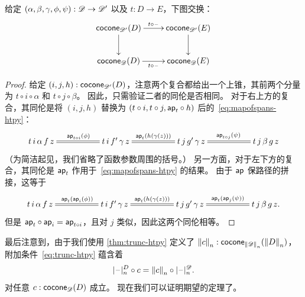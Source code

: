 \begin{lem}\label{thm:conemap-funct}
  给定 $(\alpha,\beta,\gamma,\phi,\psi):\Ddiag \to \Ddiag'$ 以及 $t:D\to E$，下图交换：
  \begin{equation*}
    \vcenter{\xymatrix{
        \cocone{\Ddiag'}{D}\ar[r]^{t \circ {\blank}}\ar[d] &
        \cocone{\Ddiag'}{E}\ar[d]\\
        \cocone{\Ddiag}{D}\ar[r]_{t \circ {\blank}} &
        \cocone{\Ddiag}{E}
      }}
  \end{equation*}
\end{lem}

\begin{proof}
  给定 $(i,j,h):\cocone{\Ddiag'}{D}$，注意两个复合都给出一个上锥，其前两个分量为 $t\circ i\circ \alpha$ 和 $t\circ j\circ\beta$。
  因此，只需验证二者的同伦是否相同。
  对于右上方的复合，其同伦是将 $(i,j,h)$ 替换为 $(t\circ i, t\circ j, \apfunc{t}\circ h)$ 后的~\eqref{eq:mapofspans-htpy}：
  \begin{equation*}
    \xymatrix@+2.8em{
      {t \, i \, \alpha \, f \, z} \ar@{=}[r]^{\apfunc{t\circ i}(\phi)} &
      {t \, i \, f' \, \gamma \, z} \ar@{=}[r]^{\apfunc{t}(h(\gamma(z)))} &
      {t \, j \, g' \, \gamma \, z} \ar@{=}[r]^{\apfunc{t\circ j}(\psi)} &
      {t \, j \, \beta \, g \, z}
    }
  \end{equation*}
  （为简洁起见，我们省略了函数参数周围的括号。）
  另一方面，对于左下方的复合，其同伦是 $\apfunc{t}$ 作用于~\eqref{eq:mapofspans-htpy} 的结果。
  由于 $\apfunc{}$ 保路径的拼接，这等于
  \begin{equation*}
    \xymatrix@+2.8em{
      {t \, i \, \alpha \, f \, z} \ar@{=}[r]^{\apfunc{t}(\apfunc{i}(\phi))} &
      {t \, i \, f' \, \gamma \, z} \ar@{=}[r]^{\apfunc{t}(h(\gamma(z)))} &
      {t \, j \, g' \, \gamma \, z} \ar@{=}[r]^{\apfunc{t}(\apfunc{j}(\psi))} &
      {t \, j \, \beta \, g \, z}. }
  \end{equation*}
  但是 $\apfunc{t}\circ \apfunc{i} = \apfunc{t\circ i}$，且对 $j$ 类似，因此这两个同伦相等。
\end{proof}

最后注意到，由于我们使用 \cref{thm:trunc-htpy} 定义了 $\trunc nc : \cocone{\trunc n \Ddiag}{\trunc n D}$，附加条件~\eqref{eq:trunc-htpy} 蕴含着
\begin{equation}
  \tprojf[D] n \circ c = \trunc n c \circ \tprojf[\Ddiag]n. \label{eq:conetrunc}
\end{equation}
对任意 $c:\cocone{\Ddiag}{D}$ 成立。
现在我们可以证明期望的定理了。

